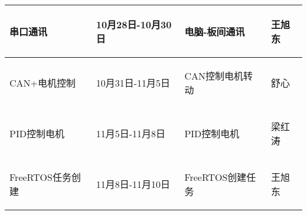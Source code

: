 \begin{longtable}{ p{1.5cm} | p{3cm} | p{6cm} | p{4.3cm} |}
    \hline

        \begin{center}
            串口通讯
        \end{center}&
        \begin{center}
            10月28日-10月30日
        \end{center}&
        \begin{center}
            电脑-板间通讯
        \end{center}&
        \begin{center}
            王旭东
        \end{center}\\
        
    \hline
    
        \begin{center}
            CAN+电机控制
        \end{center} &
        \begin{center}
            10月31日-11月5日
        \end{center} &
        \begin{center}
            CAN控制电机转动
        \end{center} &
        \begin{center}
            舒心
        \end{center} \\

    \hline
    
        \begin{center}
            PID控制电机
        \end{center} &
        \begin{center}
            11月5日-11月8日
        \end{center} &
        \begin{center}
            PID控制电机
        \end{center} &
        \begin{center}
            梁红涛
        \end{center} \\

    \hline

       \begin{center}
           FreeRTOS任务创建
       \end{center} &
       \begin{center}
           11月8日-11月10日
       \end{center} &
       \begin{center}
           FreeRTOS创建任务
       \end{center} &
       \begin{center}
           王旭东
       \end{center} \\
        

\end{longtable}
